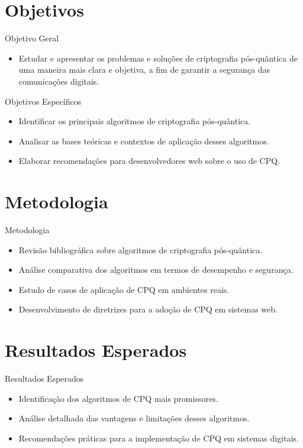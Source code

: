 \documentclass{beamer}
\begin{document}
	\section{Objetivos}
	\begin{frame}{Objetivo Geral}
		\begin{itemize}
			\item Estudar e apresentar os problemas e soluções de criptografia pós-quântica de uma maneira mais clara e objetiva, a fim de garantir a segurança das comunicações digitais.
		\end{itemize}
	\end{frame}
	
	\begin{frame}{Objetivos Específicos}
		\begin{itemize}
			\item Identificar os principais algoritmos de criptografia pós-quântica.
			\item Analisar as bases teóricas e contextos de aplicação desses algoritmos.
			\item Elaborar recomendações para desenvolvedores web sobre o uso de CPQ.
		\end{itemize}
	\end{frame}
	
	\section{Metodologia}
	\begin{frame}{Metodologia}
		\begin{itemize}
			\item Revisão bibliográfica sobre algoritmos de criptografia pós-quântica.
			\item Análise comparativa dos algoritmos em termos de desempenho e segurança.
			\item Estudo de casos de aplicação de CPQ em ambientes reais.
			\item Desenvolvimento de diretrizes para a adoção de CPQ em sistemas web.
		\end{itemize}
	\end{frame}
	
	\section{Resultados Esperados}
	\begin{frame}{Resultados Esperados}
		\begin{itemize}
			\item Identificação dos algoritmos de CPQ mais promissores.
			\item Análise detalhada das vantagens e limitações desses algoritmos.
			\item Recomendações práticas para a implementação de CPQ em sistemas digitais.
		\end{itemize}
	\end{frame}
	
\end{document}
